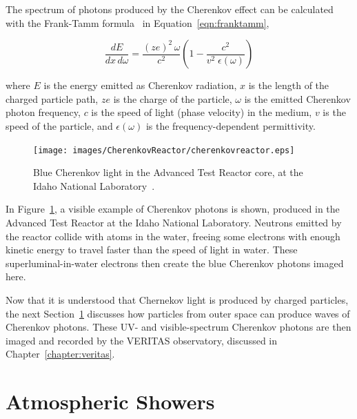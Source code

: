   The spectrum of photons produced by the Cherenkov effect can be calculated with the Frank-Tamm formula~\cite{franktamm1,franktamm2} in Equation~\ref{eqn:franktamm},
  
  \begin{equation}\label{eqn:franktamm}
    \frac{dE}{dx\,d\omega}=\frac{(ze)^2 \, \omega}{c^2} \left ( 1 - \frac{c^2}{v^2 \;\epsilon(\omega)} \right )
  \end{equation}
  
  where $E$ is the energy emitted as Cherenkov radiation, $x$ is the length of the charged particle path, $ze$ is the charge of the particle, $\omega$ is the emitted Cherenkov photon frequency, $c$ is the speed of light (phase velocity) in the medium, $v$ is the speed of the particle, and $\epsilon(\omega)$ is the frequency-dependent permittivity.
  
  \begin{figure}[ht]
    \centering
    \texttt{[image: images/CherenkovReactor/cherenkovreactor.eps]}
    \caption[Chernekov Light from a Reactor]{
      Blue Cherenkov light in the Advanced Test Reactor core, at the Idaho National Laboratory~\cite{cherenkovreactor,atrlab}.
    }
    \label{fig:cherenkovreactor}
  \end{figure}
  
  In Figure~\ref{fig:cherenkovreactor}, a visible example of Cherenkov photons is shown, produced in the Advanced Test Reactor at the Idaho National Laboratory.
  Neutrons emitted by the reactor collide with atoms in the water, freeing some electrons with enough kinetic energy to travel faster than the speed of light in water.
  These superluminal-in-water electrons then create the blue Cherenkov photons imaged here.
  
  Now that it is understood that Chernekov light is produced by charged particles, the next Section~\ref{sec:atmoshowers} discusses how particles from outer space can produce waves of Cherenkov photons.
  These UV- and visible-spectrum Cherenkov photons are then imaged and recorded by the VERITAS observatory, discussed in Chapter~\ref{chapter:veritas}.
  
    
\section{Atmospheric Showers}\label{sec:atmoshowers}

